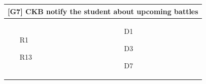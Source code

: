 \begin{tabular}{|p{6cm}|p{6cm}|}
    \hline
    \multicolumn{2}{|c|}{[G7] CKB notify the student about upcoming battles} \\
    \hline
    \begin{itemize}
        \item [R1]
        \item [R13]
    \end{itemize}
    &
    \begin{itemize}
        \item [D1]
        \item [D3]
        \item [D7]
    \end{itemize}
    \\
    \hline
\end{tabular}
